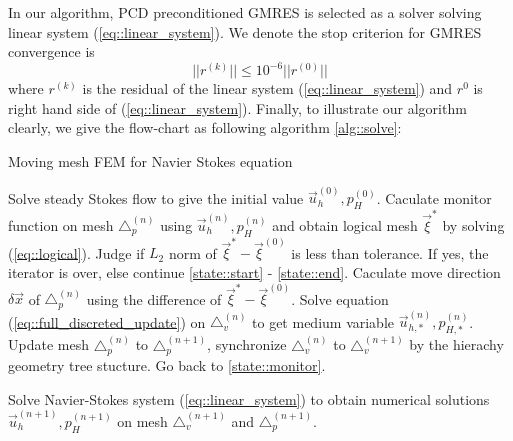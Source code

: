\documentclass{eajam}
\begin{document}
      In our algorithm, PCD preconditioned GMRES is selected as a solver
      solving linear system (\ref{eq::linear_system}). We denote the stop
      criterion for GMRES convergence is 
      \begin{equation}
        ||r^{(k)}||  \leq 10^{-6} ||r^{(0)}||
      \end{equation}
      where $r^{(k)}$ is the residual of the linear system
      (\ref{eq::linear_system}) and $r^{0}$ is right hand side of
      (\ref{eq::linear_system}). Finally, to illustrate our algorithm
      clearly, we give the flow-chart as following algorithm
      \ref{alg::solve}:
      \begin{algorithm}
        \caption{Moving mesh FEM for Navier Stokes equation}
        \begin{algorithmic}[1]
          \State Solve steady Stokes flow to give the initial
          value $\vec{u}_h^{(0)}, p_H^{(0)}$.
          \State Caculate monitor function on mesh $\triangle_p^{(n)}$
                 using $\vec{u}_h^{(n)}, p_H^{(n)}$ and obtain
                 logical mesh $\vec{\xi}^*$ by solving
                 (\ref{eq::logical}). \label{state::monitor}
          \State Judge if $L_2$ norm of $\vec{\xi}^* -
                 \vec{\xi}^{(0)}$ is less than tolerance. If yes,
                 the iterator is over, else continue
                 \ref{state::start} - \ref{state::end}.
          \State Caculate move direction $\delta \vec{x}$ of
                 $\triangle_p^{(n)}$ using the difference of
                 $\vec{\xi}^* - \vec{\xi}^{(0)}$. 
                 \label{state::start}
          \State Solve equation (\ref{eq::full_discreted_update}) on
                 $\triangle_v^{(n)}$ to get medium variable 
                 $\vec{u}_{h, *}^{(n)}, p_{H, *}^{(n)}$.
          \State Update mesh $\triangle_p^{(n)}$ to $\triangle_p^{(n +
                 1)}$, synchronize $\triangle_v^{(n)}$ to
                 $\triangle_v^{(n + 1)}$ by the hierachy geometry tree
                 stucture.
          \State Go back to \ref{state::monitor}. \label{state::end}       
          
          \State Solve Navier-Stokes system
                 (\ref{eq::linear_system}) to obtain numerical
                 solutions $\vec{u}_h^{(n + 1)}, p_H^{(n + 1)}$ on
                 mesh $\triangle_v^{(n + 1)}$ and $\triangle_p^{(n
                 + 1)}$.
          \EndWhile     
        \end{algorithmic}
        \label{alg::solve}
      \end{algorithm}
\end{document}
